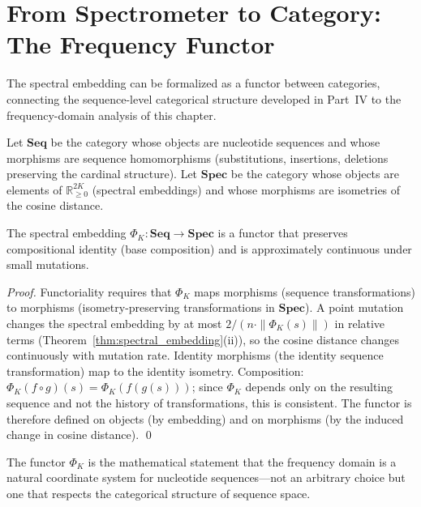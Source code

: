 \section{From Spectrometer to Category: The Frequency Functor}
\label{sec:frequency_functor}

The spectral embedding can be formalized as a functor between categories,
connecting the sequence-level categorical structure developed in Part~IV
to the frequency-domain analysis of this chapter.

\begin{definition}
\label{def:seq_cat}
Let $\mathbf{Seq}$ be the category whose objects are nucleotide sequences
and whose morphisms are sequence homomorphisms (substitutions, insertions,
deletions preserving the cardinal structure). Let $\mathbf{Spec}$ be the
category whose objects are elements of $\mathbb{R}^{2K}_{\geq 0}$ (spectral
embeddings) and whose morphisms are isometries of the cosine distance.
\end{definition}

\begin{proposition}
\label{prop:spectral_functor}
The spectral embedding $\Phi_K : \mathbf{Seq} \to \mathbf{Spec}$ is a functor
that preserves compositional identity (base composition) and is approximately
continuous under small mutations.
\end{proposition}

\begin{proof}
Functoriality requires that $\Phi_K$ maps morphisms (sequence transformations)
to morphisms (isometry-preserving transformations in $\mathbf{Spec}$). A
point mutation changes the spectral embedding by at most $2/(n \cdot \|\Phi_K(s)\|)$
in relative terms (Theorem~\ref{thm:spectral_embedding}(ii)), so the cosine
distance changes continuously with mutation rate. Identity morphisms (the
identity sequence transformation) map to the identity isometry. Composition:
$\Phi_K(f \circ g)(s) = \Phi_K(f(g(s)))$; since $\Phi_K$ depends only on the
resulting sequence and not the history of transformations, this is consistent.
The functor is therefore defined on objects (by embedding) and on morphisms
(by the induced change in cosine distance). \qed
\end{proof}

The functor $\Phi_K$ is the mathematical statement that the frequency domain
is a natural coordinate system for nucleotide sequences---not an arbitrary
choice but one that respects the categorical structure of sequence space.

